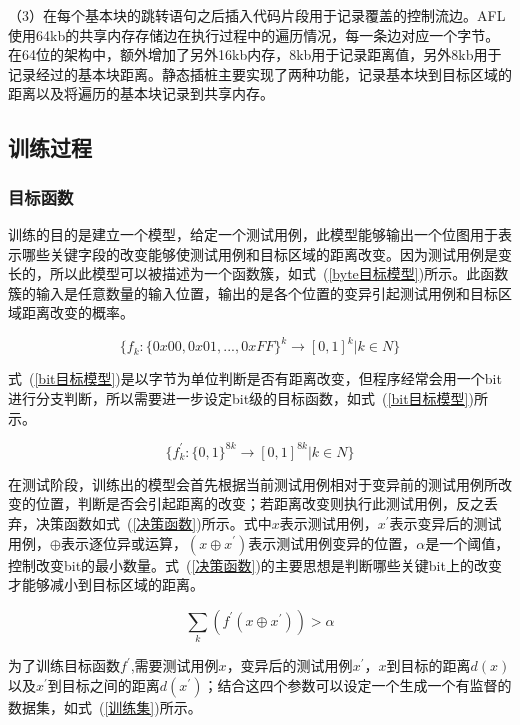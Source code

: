 （3）在每个基本块的跳转语句之后插入代码片段用于记录覆盖的控制流边。AFL使用64kb的共享内存存储边在执行过程中的遍历情况，每一条边对应一个字节。在64位的架构中，额外增加了另外16kb内存，8kb用于记录距离值，另外8kb用于记录经过的基本块距离。静态插桩主要实现了两种功能，记录基本块到目标区域的距离以及将遍历的基本块记录到共享内存。

\subsection{训练过程}

\subsubsection{目标函数}

训练的目的是建立一个模型，给定一个测试用例，此模型能够输出一个位图用于表示哪些关键字段的改变能够使测试用例和目标区域的距离改变。因为测试用例是变长的，所以此模型可以被描述为一个函数簇，如式~(\ref{byte目标模型})所示。此函数簇的输入是任意数量的输入位置，输出的是各个位置的变异引起测试用例和目标区域距离改变的概率。

\begin{equation}\label{byte目标模型}
\{f_{k}: \{0x00, 0x01, ...,0xFF \}^{k} \rightarrow [0,1]^{k} | k \in N \}
\end{equation}

式~(\ref{bit目标模型})是以字节为单位判断是否有距离改变，但程序经常会用一个bit进行分支判断，所以需要进一步设定bit级的目标函数，如式~(\ref{bit目标模型})所示。

\begin{equation}\label{bit目标模型}
\{f^{'}_{k}: \{0,1 \}^{8k} \rightarrow [0,1]^{8k} | k \in N \}
\end{equation}

在测试阶段，训练出的模型会首先根据当前测试用例相对于变异前的测试用例所改变的位置，判断是否会引起距离的改变；若距离改变则执行此测试用例，反之丢弃，决策函数如式~(\ref{决策函数})所示。式中$x$表示测试用例，$x^{'}$表示变异后的测试用例，$\oplus$表示逐位异或运算，$(x \oplus x^{'})$表示测试用例变异的位置，$\alpha$是一个阈值，控制改变bit的最小数量。式~(\ref{决策函数})的主要思想是判断哪些关键bit上的改变才能够减小到目标区域的距离。

\begin{equation}\label{决策函数}
\sum_{k}(f^{'}(x \oplus x^{'})) > \alpha
\end{equation}

为了训练目标函数$f^{'}$,需要测试用例$x$，变异后的测试用例$x^{'}$，$x$到目标的距离$d(x)$以及$x^{'}$到目标之间的距离$d(x^{'})$；结合这四个参数可以设定一个生成一个有监督的数据集，如式~(\ref{训练集})所示。

